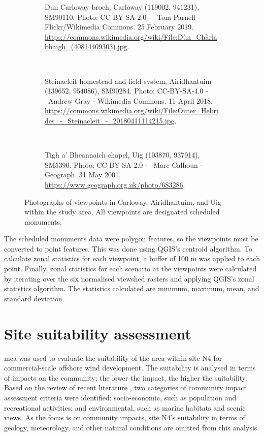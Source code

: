 \begin{figure}
  \centering
  \begin{subfigure}[t]{.48\textwidth}
    \caption*{Dun Carloway broch, Carloway (119002, 941231), SM90110. Photo: CC-BY-SA-2.0 - \textcopyright~Tom Parnell - Flickr/Wikimedia Commons. 25 February 2019. \url{https://commons.wikimedia.org/wiki/File:Dùn_Chàrlabhaigh_(40814409303).jpg}.}
  \end{subfigure}
  ~
  \begin{subfigure}[t]{.48\textwidth}
    \caption*{Steinacleit homestead and field system, Airidhantuim (139652, 954086), SM90284. Photo: CC-BY-SA-4.0 - \textcopyright~Andrew Gray - Wikimedia Commons. 11 April 2018. \url{https://commons.wikimedia.org/wiki/File:Outer_Hebrides_-_Steinacleit_-_20180411114215.jpg}.}
  \end{subfigure}
  \\[.5cm]
  \begin{subfigure}[t]{.48\textwidth}
    \caption*{Tigh a' Bheannaich chapel, Uig (103870, 937914), SM5390. Photo: CC-BY-SA-2.0 - \textcopyright~Marc Calhoun - Geograph. 31 May 2001. \url{https://www.geograph.org.uk/photo/683286}.}
  \end{subfigure}
  \caption{Photographs of viewpoints in Carloway, Airidhantuim, and Uig within the study area. All viewpoints are designated scheduled monuments. \label{fig:viewpoints2}}
\end{figure}

The scheduled monuments data were polygon features, so the viewpoints must be converted to point features. This was done using QGIS's centroid algorithm. To calculate zonal statistics for each viewpoint, a buffer of 100 m was applied to each point. Finally, zonal statistics for each scenario at the viewpoints were calculated by iterating over the six normalised viewshed rasters and applying QGIS's zonal statistics algorithm. The statistics calculated are minimum, maximum, mean, and standard deviation.

\clearpage
\section{Site suitability assessment}

\gls{mca} was used to evaluate the suitability of the area within site N4 for commercial-scale offshore wind development. The suitability is analysed in terms of impacts on the community; the lower the impact, the higher the suitability. Based on the review of recent literature \autocite{gaveriaux2019,mekonnen2015,vasileiou2017,tercan2020,deveci2020,mahdy2018,basset2021}, two categories of community impact assessment criteria were identified: socio-economic, such as population and recreational activities; and environmental, such as marine habitats and scenic views. As the focus is on community impacts, site N4's suitability in terms of geology, meteorology, and other natural conditions are omitted from this analysis.

